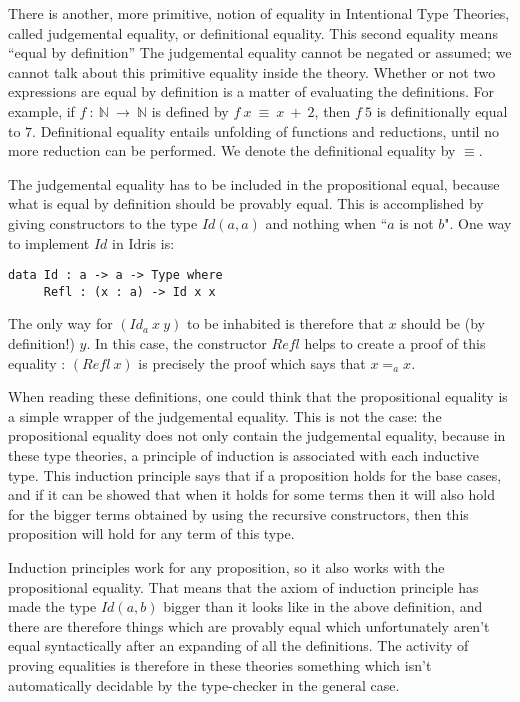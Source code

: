 There is another, more
primitive, notion of equality in Intentional Type Theories, called judgemental
equality, or definitional equality. This second equality means ``equal by
definition'' The judgemental equality cannot be negated or
assumed; we cannot talk about this primitive equality inside the theory.
Whether or not two expressions are equal by definition is a matter of
evaluating the definitions. For example, if $f\ :\ \mathbb{N}\ \rightarrow\
\mathbb{N}$ is defined by $f\ x\ \equiv\ x\ +\ 2$, then $f\ 5$ is
definitionally equal to $7$. Definitional equality entails unfolding
of functions and reductions, until no more reduction can be
performed. We denote the definitional equality by $\equiv$.

The judgemental equality has to be included in the propositional equal, because
what is equal by definition should be provably equal.  This is accomplished by
giving constructors to the type $Id(a,a)$ and nothing when ``$a$ is not $b$".
One way to implement $Id$ in Idris is:

\begin{lstlisting}
data Id : a -> a -> Type where
     Refl : (x : a) -> Id x x
\end{lstlisting}

The only way for $(Id_a\ x\ y)$ to be inhabited is therefore that $x$ should be
(by definition!) $y$. In this case, the constructor $Refl$ helps to create a
proof of this equality : $(Refl\ x)$ is precisely the proof which says that
$x=_ax$. 

When reading these definitions, one could think that the
propositional equality is a simple wrapper of the judgemental equality. This is
not the case: the propositional equality does not only contain the judgemental
equality, because in these type theories, a principle of induction is
associated with each inductive type. This induction principle says that if a
proposition holds for the base cases, and if it can be showed that when it
holds for some terms then it will also hold for the bigger terms obtained by
using the recursive constructors, then this proposition will hold for any term
of this type.

Induction principles work for any proposition, so it also works with the
propositional equality. That means that the axiom of induction principle has
made the type $Id(a,b)$ bigger than it looks like in the above definition, and
there are therefore things which are provably equal which unfortunately aren't
equal syntactically after an expanding of all the definitions. The activity of
proving equalities is therefore in these theories something which isn't
automatically decidable by the type-checker in the general case.

